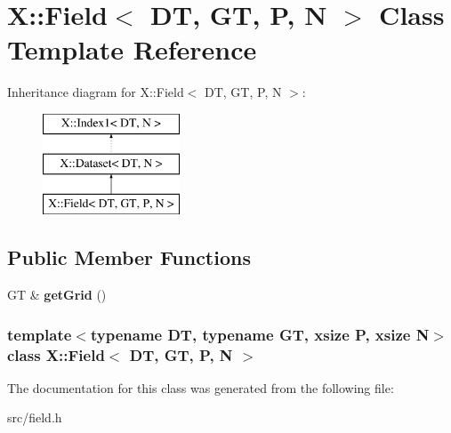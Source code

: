 \hypertarget{class_x_1_1_field}{\section{X\-:\-:Field$<$ D\-T, G\-T, P, N $>$ Class Template Reference}
\label{class_x_1_1_field}
}
Inheritance diagram for X\-:\-:Field$<$ D\-T, G\-T, P, N $>$\-:\begin{figure}[H]
\begin{center}
\leavevmode
\includegraphics[height=3.000000cm]{class_x_1_1_field}
\end{center}
\end{figure}
\subsection*{Public Member Functions}
\begin{DoxyCompactItemize}
\item 
\hypertarget{class_x_1_1_field_a0308f8c4bc709dd9075bc6b246298604}{G\-T \& {\bfseries get\-Grid} ()}\label{class_x_1_1_field_a0308f8c4bc709dd9075bc6b246298604}

\end{DoxyCompactItemize}
\subsubsection*{template$<$typename D\-T, typename G\-T, xsize P, xsize N$>$ class X\-::\-Field$<$ D\-T, G\-T, P, N $>$}



The documentation for this class was generated from the following file\-:\begin{DoxyCompactItemize}
\item 
src/field.\-h\end{DoxyCompactItemize}
